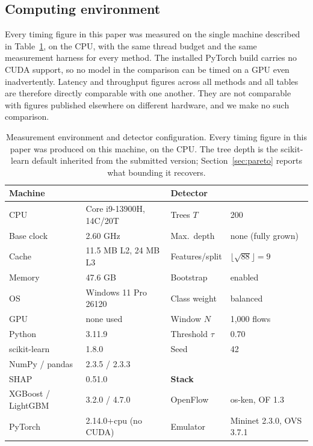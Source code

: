 \documentclass{ieeeaccess}
\begin{document}
\subsection{Computing environment}
\label{sec:environment}
Every timing figure in this paper was measured on the single machine described in Table~\ref{tab:environment}, on the CPU, with the same thread budget and the same measurement harness for every method. The installed PyTorch build carries no CUDA support, so no model in the comparison can be timed on a GPU even inadvertently. Latency and throughput figures across all methods and all tables are therefore directly comparable with one another. They are not comparable with figures published elsewhere on different hardware, and we make no such comparison.

\begin{table}[!t]
\caption{Measurement environment and detector configuration. Every timing figure
in this paper was produced on this machine, on the CPU. The tree depth is the
scikit-learn default inherited from the submitted version;
Section~\ref{sec:pareto} reports what bounding it recovers.}
\centering
\label{tab:environment}
\footnotesize
\setlength{\tabcolsep}{3pt}
\renewcommand{\arraystretch}{1.1}
\begin{tabular}{@{}llll@{}}
\toprule
\textbf{Machine} & & \textbf{Detector} & \\
\midrule
CPU & Core i9-13900H, 14C/20T & Trees $T$ & 200 \\
Base clock & 2.60 GHz & Max.\ depth & none (fully grown) \\
Cache & 11.5 MB L2, 24 MB L3 & Features/split & $\lfloor\sqrt{88}\rfloor=9$ \\
Memory & 47.6 GB & Bootstrap & enabled \\
OS & Windows 11 Pro 26120 & Class weight & balanced \\
GPU & none used & Window $N$ & 1,000 flows \\
Python & 3.11.9 & Threshold $\tau$ & 0.70 \\
scikit-learn & 1.8.0 & Seed & 42 \\
NumPy / pandas & 2.3.5 / 2.3.3 & & \\
SHAP & 0.51.0 & \textbf{Stack} & \\
XGBoost / LightGBM & 3.2.0 / 4.7.0 & OpenFlow & os-ken, OF 1.3 \\
PyTorch & 2.14.0+cpu (no CUDA) & Emulator & Mininet 2.3.0, OVS 3.7.1 \\
\bottomrule
\end{tabular}
\end{table}
\end{document}
